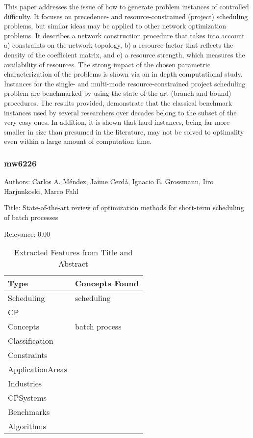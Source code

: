   This paper addresses the issue of how to generate problem instances of controlled difficulty. It focuses on precedence- and resource-constrained (project) scheduling problems, but similar ideas may be applied to other network optimization problems. It describes a network construction procedure that takes into account a) constraints on the network topology, b) a resource factor that reflects the density of the coefficient matrix, and c) a resource strength, which measures the availability of resources. The strong impact of the chosen parametric characterization of the problems is shown via an in depth computational study. Instances for the single- and multi-mode resource-constrained project scheduling problem are benchmarked by using the state of the art (branch and bound) procedures. The results provided, demonstrate that the classical benchmark instances used by several researchers over decades belong to the subset of the very easy ones. In addition, it is shown that hard instances, being far more smaller in size than presumed in the literature, may not be solved to optimality even within a large amount of computation time.  

\subsubsection{mw6226}
\label{mw:mw6226}

Authors: Carlos A. Méndez, Jaime Cerdá, Ignacio E. Grossmann, Iiro Harjunkoski, Marco Fahl

Title: State-of-the-art review of optimization methods for short-term scheduling of batch processes

Relevance:  0.00

{\scriptsize
\begin{longtable}{p{2cm}p{20cm}}
\caption{Extracted Features from Title and Abstract}\\ \toprule
Type & Concepts Found\\ \midrule
\endhead
\bottomrule
\endfoot
Scheduling & scheduling\\ 
CP & \\ 
Concepts & batch process\\ 
Classification & \\ 
Constraints & \\ 
ApplicationAreas & \\ 
Industries & \\ 
CPSystems & \\ 
Benchmarks & \\ 
Algorithms & \\ 
\end{longtable}
}



